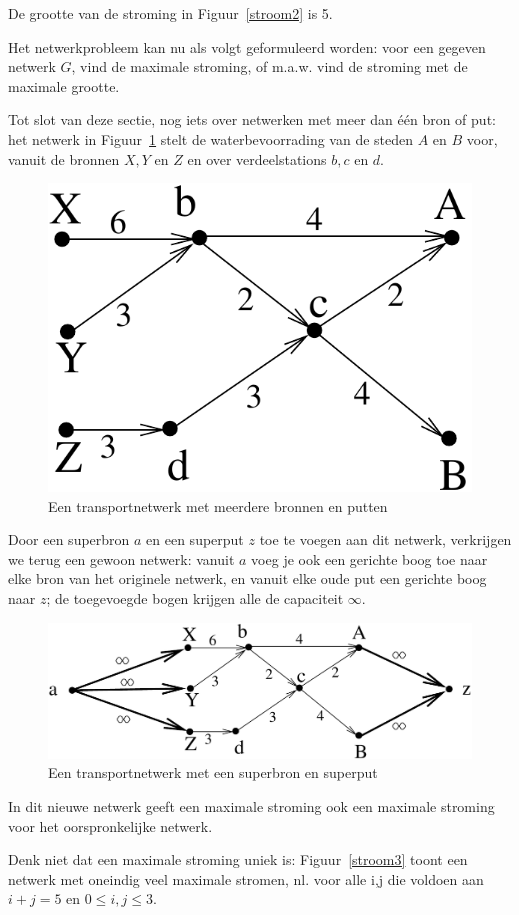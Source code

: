 De grootte van de stroming in Figuur~\ref{stroom2} is 5.



Het netwerkprobleem kan nu als volgt geformuleerd worden: voor een
gegeven netwerk $G$, vind de maximale stroming, of m.a.w. vind de stroming
met de maximale grootte.



Tot slot van deze sectie, nog iets over netwerken met meer dan
\'{e}\'{e}n bron of put: het netwerk in Figuur~\ref{transport2} stelt
de waterbevoorrading van de steden $A$ en $B$ voor, vanuit de bronnen $X,Y$
en $Z$ en over verdeelstations $b,c$ en $d$.

\begin{figure}[ht]
\begin{center}
\includegraphics[width=0.22\linewidth,keepaspectratio]{transport2} %
\end{center}
\caption{Een transportnetwerk met meerdere bronnen en putten \label{transport2}}
\end{figure}

Door een superbron $a$ en een superput $z$ toe te voegen aan dit netwerk,
verkrijgen we terug een gewoon netwerk: vanuit $a$ voeg je ook een
gerichte boog toe naar elke bron van het originele netwerk, en vanuit
elke oude put een gerichte boog naar $z$; de toegevoegde bogen krijgen
alle de capaciteit $\infty$.

\begin{figure}[ht]
\begin{center}
\includegraphics[width=0.507\linewidth,keepaspectratio]{transport3} %
\end{center}
\caption{Een transportnetwerk met een superbron en superput \label{transport3}}
\end{figure}

In dit nieuwe netwerk geeft een maximale stroming ook een maximale
stroming voor het oorspronkelijke netwerk.

Denk niet dat een maximale stroming uniek is: Figuur~\ref{stroom3} toont
een netwerk met oneindig veel maximale stromen, nl. voor alle i,j die
voldoen aan $i+j = 5$ en $0 \leq i,j \leq 3$.

